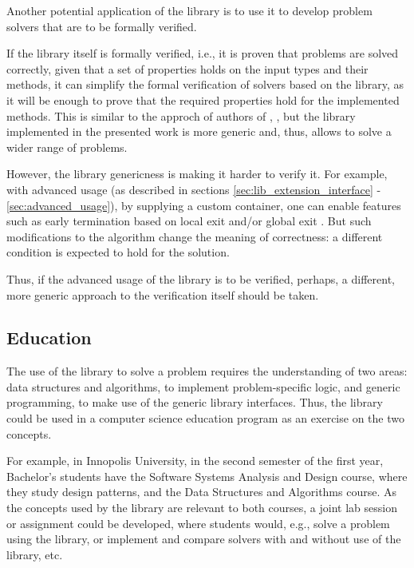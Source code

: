 Another potential application of the library is to use it to develop problem solvers
that are to be formally verified.

If the library itself is formally verified, i.e., it is proven that problems are solved
correctly, given that a set of properties holds on the input types and their methods,
it can simplify the formal verification of solvers based on the library, as it will be
enough to prove that the required properties hold for the implemented methods.
This is similar to the approch
of authors of \cite{narkawicz2013formalnasa}, \cite{smith2015rigorous}, but the library
implemented in the presented work is more generic and, thus, allows to solve a wider range
of problems.

However, the library genericness is making it harder to verify it. For example,
with advanced usage (as described in sections
\ref{sec:lib_extension_interface} - \ref{sec:advanced_usage}), by supplying a
custom container, one can enable features such as early termination based on
local exit and/or global exit \cite{narkawicz2013formalnasa}. But such modifications to
the algorithm change the meaning of correctness: a different condition is expected to hold
for the solution.

Thus, if the advanced usage of the library is to be verified, perhaps, a different,
more generic approach to the verification itself should be taken.

\subsection{Education}

The use of the library to solve a problem requires the understanding of two areas:
data structures and algorithms, to implement problem-specific logic,
and generic programming, to make use of the generic library interfaces. Thus, the library
could be used in a computer science education program as an exercise on the two concepts.

For example, in Innopolis University, in the second semester of the first year,
Bachelor's students have the Software Systems Analysis and Design course, where
they study design patterns, and the Data Structures and Algorithms course. As the concepts
used by the library are relevant to both courses, a joint lab session or assignment could be
developed, where students would, e.g., solve a problem using the library, or implement and
compare solvers with and without use of the library, etc.

